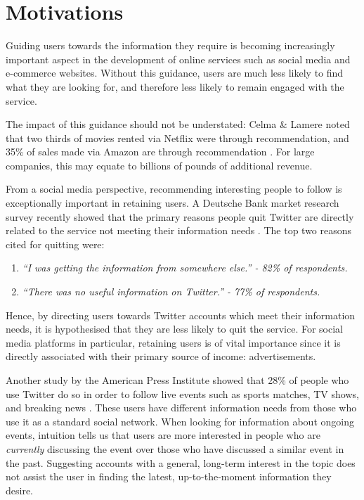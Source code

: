 \documentclass{l4proj}
\begin{document}
\section{Motivations}
Guiding users towards the information they require is becoming increasingly important aspect in the development of online services such as social media and e-commerce websites. Without this guidance, users are much less likely to find what they are looking for, and therefore less likely to remain engaged with the service.

The impact of this guidance should not be understated: Celma \& Lamere noted that two thirds of movies rented via Netflix were through recommendation, and 35\% of sales made via Amazon are through recommendation \cite{celmaLamere}. For large companies, this may equate to billions of pounds of additional revenue.

From a social media perspective, recommending interesting people to follow is exceptionally important in retaining users. A Deutsche Bank market research survey recently showed that the primary reasons people quit Twitter are directly related to the service not meeting their information needs \cite{leavingTwitter}. The top two reasons cited for quitting were:

\begin{enumerate}
    \item \textit{``I was getting the information from somewhere else.'' - 82\% of respondents. }
    \item \textit{``There was no useful information on Twitter.'' - 77\% of respondents.}
\end{enumerate}

Hence, by directing users towards Twitter accounts which meet their information needs, it is hypothesised that they are less likely to quit the service. For social media platforms in particular, retaining users is of vital importance since it is directly associated with their primary source of income: advertisements.

Another study by the American Press Institute showed that 28\% of people who use Twitter do so in order to follow live events such as sports matches, TV shows, and breaking news \cite{twitterNews}. These users have different information needs from those who use it as a standard social network. When looking for information about ongoing events, intuition tells us that users are more interested in people who are \textit{currently} discussing the event over those who have discussed a similar event in the past. Suggesting accounts with a general, long-term interest in the topic does not assist the user in finding the latest, up-to-the-moment information they desire.
\end{document}
